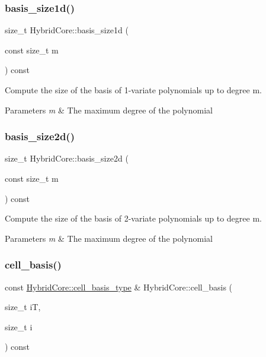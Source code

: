 \subsubsection{\texorpdfstring{basis\+\_\+size1d()}{basis\_size1d()}}
{\footnotesize\ttfamily size\+\_\+t Hybrid\+Core\+::basis\+\_\+size1d (\begin{DoxyParamCaption}\item[{const size\+\_\+t}]{m }\end{DoxyParamCaption}) const}



Compute the size of the basis of 1-\/variate polynomials up to degree m. 


\begin{DoxyParams}{Parameters}
{\em m} & The maximum degree of the polynomial \\
\hline
\end{DoxyParams}
\mbox{\label{classHCore2D_1_1HybridCore_a09aabd37f36e11bbcfffbb5bb59e54d2}} 
\subsubsection{\texorpdfstring{basis\+\_\+size2d()}{basis\_size2d()}}
{\footnotesize\ttfamily size\+\_\+t Hybrid\+Core\+::basis\+\_\+size2d (\begin{DoxyParamCaption}\item[{const size\+\_\+t}]{m }\end{DoxyParamCaption}) const}



Compute the size of the basis of 2-\/variate polynomials up to degree m. 


\begin{DoxyParams}{Parameters}
{\em m} & The maximum degree of the polynomial \\
\hline
\end{DoxyParams}
\mbox{\label{classHCore2D_1_1HybridCore_a34242db07cc2b3c3b867d9e4580b634d}} 
\subsubsection{\texorpdfstring{cell\+\_\+basis()}{cell\_basis()}}
{\footnotesize\ttfamily const \hyperlink{classHCore2D_1_1HybridCore_a0111ea462b9a3b9859e1582b4bdaf63f}{Hybrid\+Core\+::cell\+\_\+basis\+\_\+type} \& Hybrid\+Core\+::cell\+\_\+basis (\begin{DoxyParamCaption}\item[{size\+\_\+t}]{iT,  }\item[{size\+\_\+t}]{i }\end{DoxyParamCaption}) const}



